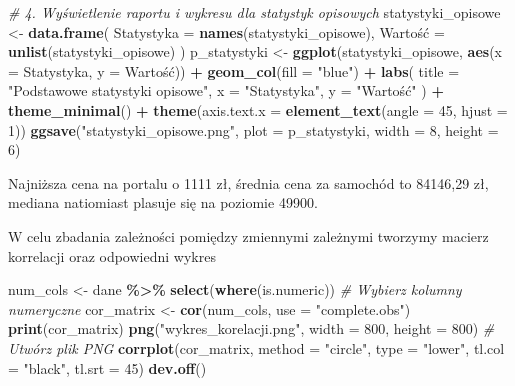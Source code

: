 \documentclass[
]{article}
\newenvironment{Shaded}{\begin{snugshade}}{\end{snugshade}}
\newcommand{\AttributeTok}[1]{\textcolor[rgb]{0.13,0.29,0.53}{#1}}
\newcommand{\CommentTok}[1]{\textcolor[rgb]{0.56,0.35,0.01}{\textit{#1}}}
\newcommand{\DecValTok}[1]{\textcolor[rgb]{0.00,0.00,0.81}{#1}}
\newcommand{\FunctionTok}[1]{\textcolor[rgb]{0.13,0.29,0.53}{\textbf{#1}}}
\newcommand{\NormalTok}[1]{#1}
\newcommand{\OtherTok}[1]{\textcolor[rgb]{0.56,0.35,0.01}{#1}}
\newcommand{\SpecialCharTok}[1]{\textcolor[rgb]{0.81,0.36,0.00}{\textbf{#1}}}
\newcommand{\StringTok}[1]{\textcolor[rgb]{0.31,0.60,0.02}{#1}}
\begin{document}
\begin{Shaded}
\begin{Highlighting}[]
\CommentTok{\# 4. Wyświetlenie raportu i wykresu dla statystyk opisowych}
\NormalTok{statystyki\_opisowe }\OtherTok{\textless{}{-}} \FunctionTok{data.frame}\NormalTok{(}
  \AttributeTok{Statystyka =} \FunctionTok{names}\NormalTok{(statystyki\_opisowe),}
\NormalTok{  Wartość }\OtherTok{=} \FunctionTok{unlist}\NormalTok{(statystyki\_opisowe)}
\NormalTok{)}
\NormalTok{p\_statystyki }\OtherTok{\textless{}{-}} \FunctionTok{ggplot}\NormalTok{(statystyki\_opisowe, }\FunctionTok{aes}\NormalTok{(}\AttributeTok{x =}\NormalTok{ Statystyka, }\AttributeTok{y =}\NormalTok{ Wartość)) }\SpecialCharTok{+}
  \FunctionTok{geom\_col}\NormalTok{(}\AttributeTok{fill =} \StringTok{"blue"}\NormalTok{) }\SpecialCharTok{+}
  \FunctionTok{labs}\NormalTok{(}
    \AttributeTok{title =} \StringTok{"Podstawowe statystyki opisowe"}\NormalTok{,}
    \AttributeTok{x =} \StringTok{"Statystyka"}\NormalTok{,}
    \AttributeTok{y =} \StringTok{"Wartość"}
\NormalTok{  ) }\SpecialCharTok{+}
  \FunctionTok{theme\_minimal}\NormalTok{() }\SpecialCharTok{+}
  \FunctionTok{theme}\NormalTok{(}\AttributeTok{axis.text.x =} \FunctionTok{element\_text}\NormalTok{(}\AttributeTok{angle =} \DecValTok{45}\NormalTok{, }\AttributeTok{hjust =} \DecValTok{1}\NormalTok{))}
\FunctionTok{ggsave}\NormalTok{(}\StringTok{"statystyki\_opisowe.png"}\NormalTok{, }\AttributeTok{plot =}\NormalTok{ p\_statystyki, }\AttributeTok{width =} \DecValTok{8}\NormalTok{, }\AttributeTok{height =} \DecValTok{6}\NormalTok{)}
\end{Highlighting}
\end{Shaded}

Najniższa cena na portalu o 1111 zł, średnia cena za samochód to
84146,29 zł, mediana natiomiast plasuje się na poziomie 49900.

W celu zbadania zależności pomiędzy zmiennymi zależnymi tworzymy macierz
korrelacji oraz odpowiedni wykres

\begin{Shaded}
\begin{Highlighting}[]
\NormalTok{num\_cols }\OtherTok{\textless{}{-}}\NormalTok{ dane }\SpecialCharTok{\%\textgreater{}\%} \FunctionTok{select}\NormalTok{(}\FunctionTok{where}\NormalTok{(is.numeric)) }\CommentTok{\# Wybierz kolumny numeryczne}
\NormalTok{cor\_matrix }\OtherTok{\textless{}{-}} \FunctionTok{cor}\NormalTok{(num\_cols, }\AttributeTok{use =} \StringTok{"complete.obs"}\NormalTok{)}
\FunctionTok{print}\NormalTok{(cor\_matrix)}
\FunctionTok{png}\NormalTok{(}\StringTok{"wykres\_korelacji.png"}\NormalTok{, }\AttributeTok{width =} \DecValTok{800}\NormalTok{, }\AttributeTok{height =} \DecValTok{800}\NormalTok{) }\CommentTok{\# Utwórz plik PNG}
\FunctionTok{corrplot}\NormalTok{(cor\_matrix, }\AttributeTok{method =} \StringTok{"circle"}\NormalTok{, }\AttributeTok{type =} \StringTok{"lower"}\NormalTok{, }\AttributeTok{tl.col =} \StringTok{"black"}\NormalTok{, }\AttributeTok{tl.srt =} \DecValTok{45}\NormalTok{)}
\FunctionTok{dev.off}\NormalTok{()}
\end{Highlighting}
\end{Shaded}
\end{document}
